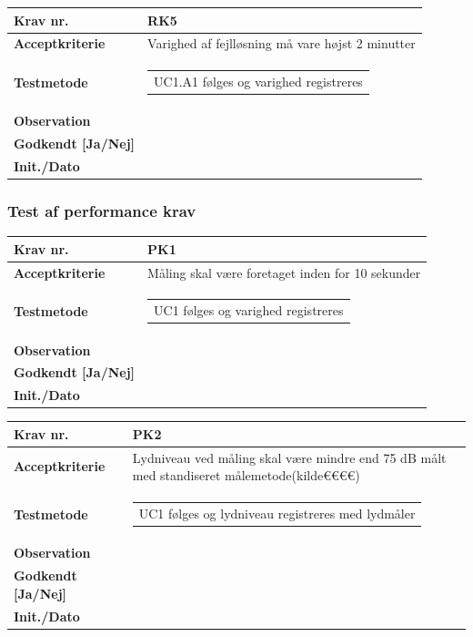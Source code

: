 \begin{tabularx}{1\textwidth}{|l|X|}
\hline
\textbf{Krav nr.}              & RK5  \\ \hline
\textbf{Acceptkriterie}        & Varighed af fejlløsning må vare højst 2 minutter  \\ \hline
\textbf{Testmetode}            & \begin{tabular}[l]{@{}l@{}} UC1.A1 følges og varighed registreres \end{tabular}  \\ \hline
\textbf{Observation}           &  \\ \hline
\textbf{Godkendt {[}Ja/Nej{]}} &  \\ \hline
\textbf{Init./Dato}            &  \\ \hline
\end{tabularx}

\vspace{5mm}

\subsubsection{Test af performance krav}

\begin{tabularx}{1\textwidth}{|l|X|}
\hline
\textbf{Krav nr.}              & PK1  \\ \hline
\textbf{Acceptkriterie}        & Måling skal være foretaget inden for 10 sekunder  \\ \hline
\textbf{Testmetode}            & \begin{tabular}[l]{@{}l@{}} UC1 følges og varighed registreres \end{tabular}  \\ \hline
\textbf{Observation}           &  \\ \hline
\textbf{Godkendt {[}Ja/Nej{]}} &  \\ \hline
\textbf{Init./Dato}            &  \\ \hline
\end{tabularx}

\begin{tabularx}{1\textwidth}{|l|X|}
\hline
\textbf{Krav nr.}              & PK2  \\ \hline
\textbf{Acceptkriterie}        & Lydniveau ved måling skal være mindre end 75 dB målt med standiseret målemetode(kilde€€€€) \\ \hline
\textbf{Testmetode}            & \begin{tabular}[l]{@{}l@{}} UC1 følges og lydniveau registreres med lydmåler \end{tabular}  \\ \hline
\textbf{Observation}           &  \\ \hline
\textbf{Godkendt {[}Ja/Nej{]}} &  \\ \hline
\textbf{Init./Dato}            &  \\ \hline
\end{tabularx}

